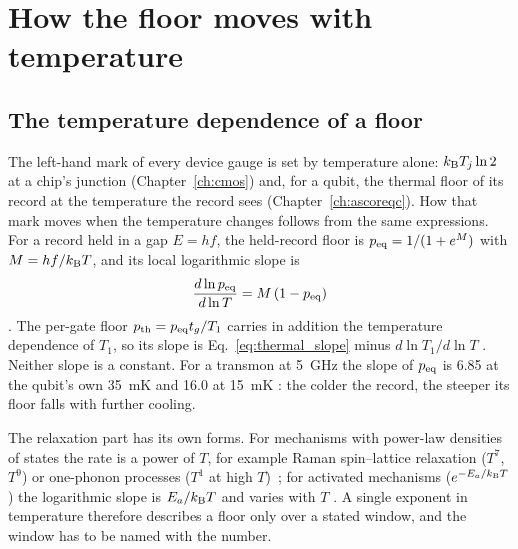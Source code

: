 \chapter{How the floor moves with temperature}\label{ch:thermaln}

\section{The temperature dependence of a floor}\label{sec:floorT}

The left-hand mark of every device gauge is set by temperature alone: $k_{\mathrm B} T_j\ln2$ at a chip's junction (Chapter~\ref{ch:cmos}) and, for a
qubit, the thermal floor of its record at the temperature the record sees (Chapter~\ref{ch:ascoreqc}). How that mark moves when the
temperature changes follows from the same expressions. For a record held in a gap $E=hf$, the held-record floor is
$p_{\rm eq}=1/(1+e^{M})$ with $M=hf/k_{\mathrm B} T$, and its local logarithmic slope is
\begin{equation}
 \frac{d\ln p_{\rm eq}}{d\ln T}=M\,(1-p_{\rm eq})
 \label{eq:thermal_slope}
\end{equation}
\derived. The per-gate floor $p_{\rm th}=p_{\rm eq}t_g/T_1$ carries in addition the temperature dependence of $T_1$, so its slope is
Eq.~\eqref{eq:thermal_slope} minus $d\ln T_1/d\ln T$ \derived. Neither slope is a constant. For a transmon at 5~GHz the slope of $p_{\rm eq}$
is 6.85 at the qubit's own 35~mK and 16.0 at 15~mK \calc: the colder the record, the steeper its floor falls with further cooling.

The relaxation part has its own forms. For mechanisms with power-law densities of states the rate is a power of $T$, for example Raman
spin--lattice relaxation ($T^7$, $T^9$) or one-phonon processes ($T^1$ at high $T$)~\cite{Abragam1970}; for activated mechanisms
($e^{-E_a/k_{\mathrm B} T}$) the logarithmic slope is $E_a/k_{\mathrm B} T$ and varies with $T$ \derived. A single exponent in temperature therefore describes a
floor only over a stated window, and the window has to be named with the number.

